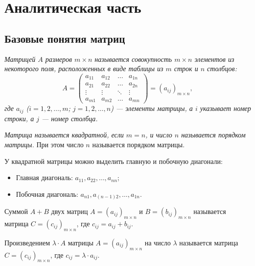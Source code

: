 \section{Аналитическая часть}

\subsection{Базовые понятия матриц}

\hspace{1.25cm}
\begin{definition}

    \textit{Матрицей $A$ размеров $m \times n$ называется совокупность $m \times n$ элементов из некоторого поля, расположенных в виде таблицы из $m$ строк и $n$ столбцов:}
    \[
    A = 
    \begin{pmatrix}
    a_{11} & a_{12} & \dots & a_{1n} \\
    a_{21} & a_{22} & \dots & a_{2n} \\
    \vdots & \vdots & \ddots & \vdots \\
    a_{m1} & a_{m2} & \dots & a_{mn}
    \end{pmatrix} = (a_{ij})_{m \times n},
    \]
    \textit{где $a_{ij}$ ($i = 1, 2, \dots, m$; $j = 1, 2, \dots, n$) — элементы матрицы, а $i$ указывает номер строки, а $j$ — номер столбца.}
\end{definition}

\begin{definition}
    \textit{Матрица называется квадратной, если $m = n$, и число $n$ называется порядком матрицы.}
При этом число $n$ называется порядком матрицы.
\end{definition}

У квадратной матрицы можно выделить главную и побочную диагонали:
\begin{itemize}
    \item Главная диагональ: $a_{11}, a_{22}, \dots, a_{nn}$;
    \item Побочная диагональ: $a_{n1}, a_{(n-1)2}, \dots, a_{1n}$.
\end{itemize}

\begin{definition}
Суммой $A + B$ двух матриц $A = (a_{ij})_{m \times n}$ и $B = (b_{ij})_{m \times n}$ называется матрица $C = (c_{ij})_{m \times n}$, где $c_{ij} = a_{ij} + b_{ij}$.
\end{definition}

\begin{definition}
Произведением $\lambda \cdot A$ матрицы $A = (a_{ij})_{m \times n}$ на число $\lambda$ называется матрица $C = (c_{ij})_{m \times n}$, где $c_{ij} = \lambda \cdot a_{ij}$. \cite{nikitenko}
\end{definition}

